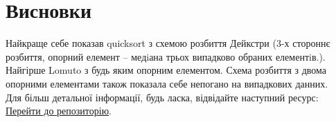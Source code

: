 \documentclass[a4paper,12pt]{article}
\begin{document}
\section{Висновки}
Найкраще себе показав quicksort з схемою розбиття Дейкстри (3-х стороннє розбиття, опорний елемент -- медiана трьох випадково обраних
елементiв.). Найгірше Lomuto з будь яким опорним елементом. Схема розбиття з двома опорними елементами також показала себе непогано на випадкових данних.\\
Для більш детальної інформації, будь ласка, відвідайте наступний ресурс:
\href{https://github.com/gre1wy/AppliedAlgorithms/tree/main/lab7}{Перейти до репозиторію}.
\end{document}
